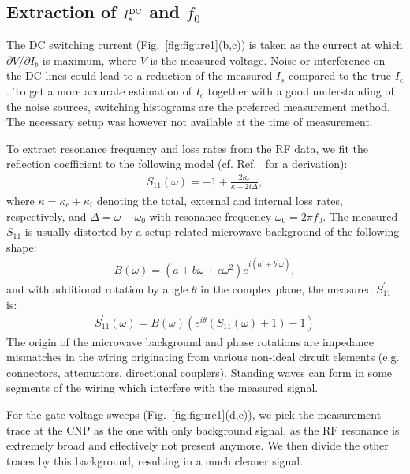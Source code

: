 \subsection{Extraction of $I_s^{\rm DC}$ and $f_0$}\label{sec:extraction}

The DC switching current (Fig.~\ref{fig:figure1}(b,c)) is taken as the current at which $\partial V/\partial I_b$ is maximum, where $V$ is the measured voltage.
%
Noise or interference on the DC lines could lead to a reduction of the measured $I_s$ compared to the true $I_c$.
%
To get a more accurate estimation of $I_c$ together with a good understanding of the noise sources, switching histograms are the preferred measurement method.
%
The necessary setup was however not available at the time of measurement.

To extract resonance frequency and loss rates from the RF data, we fit the reflection coefficient to the following model (cf. Ref.~\cite{bosmanBroadbandArchitectureGalvanically2015c} for a derivation):
%
\begin{align}
S_{11}(\omega) = -1+\frac{2\kappa_e}{\kappa+2i\Delta},
\end{align}
%
where $\kappa=\kappa_e+\kappa_i$ denoting the total, external and internal loss rates, respectively, and $\Delta=\omega-\omega_0$ with resonance frequency $\omega_0=2\pi f_0$.
%
The measured $S_{11}$ is usually distorted by a setup-related microwave background of the following shape:
\begin{align}
B(\omega) = \left(a+b\omega+c\omega^2\right)e^{i\left(a^\prime+b^\prime\omega\right)},
\end{align}
%
and with additional rotation by angle $\theta$ in the complex plane, the measured $S_{11}^\prime$ is:
\begin{align}
S_{11}^\prime(\omega)=B(\omega)\left(e^{i\theta}\left(S_{11}(\omega)+1\right)-1\right)
\end{align}
%
The origin of the microwave background and phase rotations are impedance mismatches in the wiring originating from various non-ideal circuit elements (e.g. connectors, attenuators, directional couplers).
%
Standing waves can form in some segments of the wiring which interfere with the measured signal.

For the gate voltage sweeps (Fig.~\ref{fig:figure1}(d,e)), we pick the measurement trace at the CNP as the one with only background signal, as the RF resonance is extremely broad and effectively not present anymore.
%
We then divide the other traces by this background, resulting in a much cleaner signal.


